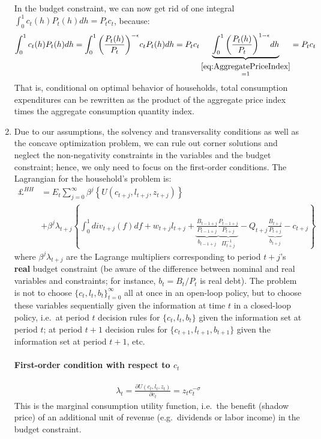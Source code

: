 \begin{enumerate}
In the budget constraint, we can now get rid of one integral \(\int_0^1 c_t(h) P_t(h) dh = P_t c_t\), because:
\begin{align*}
	\int_0^1 c_t(h) P_t(h) dh = \int_0^1 {\left(\frac{P_t(h)}{P_t}\right)}^{-\epsilon} c_t P_t(h) dh
	= P_t c_t \underbrace{\int_0^1 {\left(\frac{P_t(h)}{P_t}\right)}^{1-\epsilon}  dh}_{\overset{\eqref{eq:AggregatePriceIndex}}{=1}} = P_t c_t
\end{align*}
That is, conditional on optimal behavior of households,
  total consumption expenditures can be rewritten as the product of the aggregate price index times the aggregate consumption quantity index.

\item Due to our assumptions, the solvency and transversality conditions as well as the concave optimization problem,
  we can rule out corner solutions and neglect the non-negativity constraints in the variables and the budget constraint;
  hence, we only need to focus on the first-order conditions.
The Lagrangian for the household's problem is:
\begin{align*}
	\pounds^{HH} &= E_t \sum_{j=0}^{\infty} \beta^j \left \{	U\left({c}_{t+j},l_{t+j},z_{t+j}\right) \right \}
	\\
	& + \beta^j \lambda_{t+j} \left \{ \int_0^1 div_{t+j}(f) df + w_{t+j} l_{t+j} + \underbrace{\frac{B_{t-1+j}}{P_{t-1+j}}}_{b_{t-1+j}} \underbrace{\frac{P_{t-1+j}}{P_{t+j}}}_{\Pi_{t+j}^{-1}} - Q_{t+j} \underbrace{\frac{B_{t+j}}{P_{t+j}}}_{b_{t+j}} - c_{t+j} 
	\right \}
\end{align*}
where \(\beta^j\lambda_{t+j}\) are the Lagrange multipliers corresponding to period \(t+j\)'s \textbf{real} budget constraint
  (be aware of the difference between nominal and real variables and constraints; for instance, \(b_t=B_t/P_t\) is real debt).
The problem is not to choose \({\{c_t,l_t,b_{t}\}}_{t=0}^\infty \) all at once in an open-loop policy,
  but to choose these variables sequentially given the information at time \(t\) in a closed-loop policy,
  i.e.\ at period \(t\) decision rules for \({\{c_t,l_t,b_{t}\}}\) given the information set at period \(t\);
   at period \(t+1\) decision rules for \({\{c_{t+1},l_{t+1},b_{t+1}\}}\) given the information set at period \(t+1\), etc.
	
\paragraph{First-order condition with respect to \(c_t\)}
\begin{align}
	\lambda_t = \frac{\partial U(c_t,l_t,z_t)}{\partial c_t} = z_t c_t^{-\sigma}
\end{align}
This is the marginal consumption utility function, i.e.\ the benefit (shadow price) of an additional unit of revenue (e.g.\ dividends or labor income) in the budget constraint.
	

\end{enumerate}
